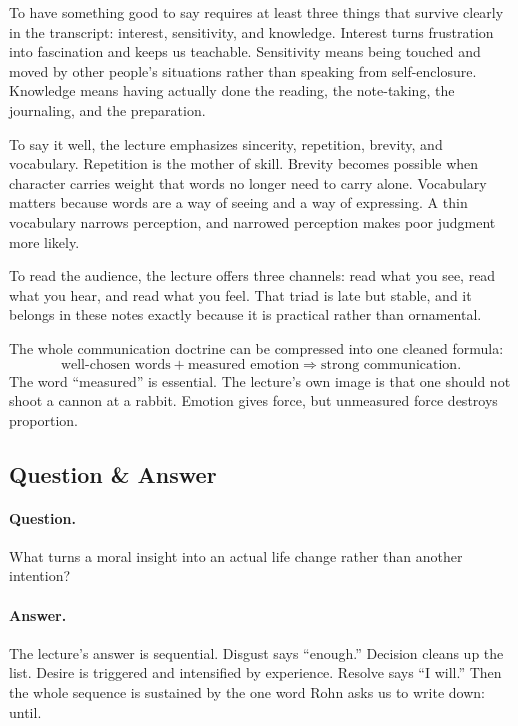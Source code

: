To have something good to say requires at least three things that survive clearly in the transcript: interest, sensitivity, and knowledge. Interest turns frustration into fascination and keeps us teachable. Sensitivity means being touched and moved by other people's situations rather than speaking from self-enclosure. Knowledge means having actually done the reading, the note-taking, the journaling, and the preparation.

To say it well, the lecture emphasizes sincerity, repetition, brevity, and vocabulary. Repetition is the mother of skill. Brevity becomes possible when character carries weight that words no longer need to carry alone. Vocabulary matters because words are a way of seeing and a way of expressing. A thin vocabulary narrows perception, and narrowed perception makes poor judgment more likely.

To read the audience, the lecture offers three channels: read what you see, read what you hear, and read what you feel. That triad is late but stable, and it belongs in these notes exactly because it is practical rather than ornamental.

The whole communication doctrine can be compressed into one cleaned formula:
\begin{equation}
\text{well-chosen words}+\text{measured emotion}\Rightarrow \text{strong communication}.
\end{equation}
The word ``measured'' is essential. The lecture's own image is that one should not shoot a cannon at a rabbit. Emotion gives force, but unmeasured force destroys proportion.

\subsection{Question \& Answer}

\paragraph{Question.} What turns a moral insight into an actual life change rather than another intention?

\paragraph{Answer.} The lecture's answer is sequential. Disgust says ``enough.'' Decision cleans up the list. Desire is triggered and intensified by experience. Resolve says ``I will.'' Then the whole sequence is sustained by the one word Rohn asks us to write down: until.

